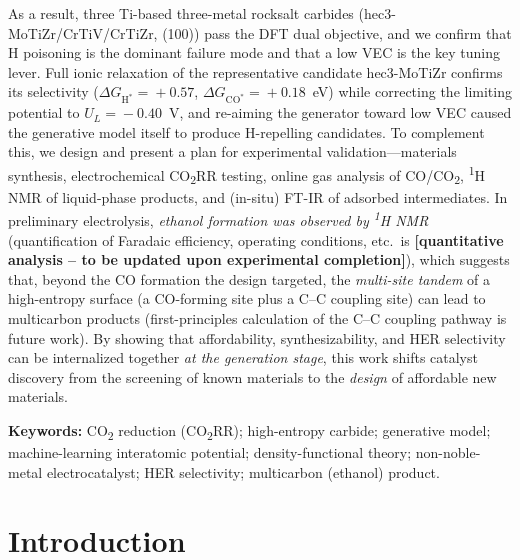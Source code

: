 \documentclass[11pt,a4paper]{report}
\newcommand{\tbu}[1]{\textcolor{red!70!black}{\textbf{[#1 -- to be updated upon experimental completion]}}}
\newcommand{\dGCO}{\Delta G_{\mathrm{CO^*}}}
\newcommand{\dGH}{\Delta G_{\mathrm{H^*}}}
\begin{document}
As a result, three Ti-based three-metal rocksalt carbides (hec3-MoTiZr/CrTiV/CrTiZr, (100)) pass the DFT dual objective, and we confirm that H poisoning is the dominant failure mode and that a low VEC is the key tuning lever. Full ionic relaxation of the representative candidate hec3-MoTiZr confirms its selectivity ($\dGH\!=\!+0.57$, $\dGCO\!=\!+0.18$~eV) while correcting the limiting potential to $U_L\!=\!-0.40$~V, and re-aiming the generator toward low VEC caused the generative model itself to produce H-repelling candidates. To complement this, we design and present a plan for experimental validation---materials synthesis, electrochemical CO\textsubscript{2}RR testing, online gas analysis of CO/CO\textsubscript{2}, \textsuperscript{1}H NMR of liquid-phase products, and (in-situ) FT-IR of adsorbed intermediates. In preliminary electrolysis, \emph{ethanol formation was observed by \textsuperscript{1}H NMR} (quantification of Faradaic efficiency, operating conditions, etc.\ is \tbu{quantitative analysis}), which suggests that, beyond the CO formation the design targeted, the \emph{multi-site tandem} of a high-entropy surface (a CO-forming site plus a C--C coupling site) can lead to multicarbon products (first-principles calculation of the C--C coupling pathway is future work). By showing that affordability, synthesizability, and HER selectivity can be internalized together \emph{at the generation stage}, this work shifts catalyst discovery from the screening of known materials to the \emph{design} of affordable new materials.
\par\vspace{6pt}
\noindent\textbf{Keywords:} CO\textsubscript{2} reduction (CO\textsubscript{2}RR); high-entropy carbide; generative model; machine-learning interatomic potential; density-functional theory; non-noble-metal electrocatalyst; HER selectivity; multicarbon (ethanol) product.

\tableofcontents

\chapter{Introduction}
\label{ch:intro}
\end{document}
